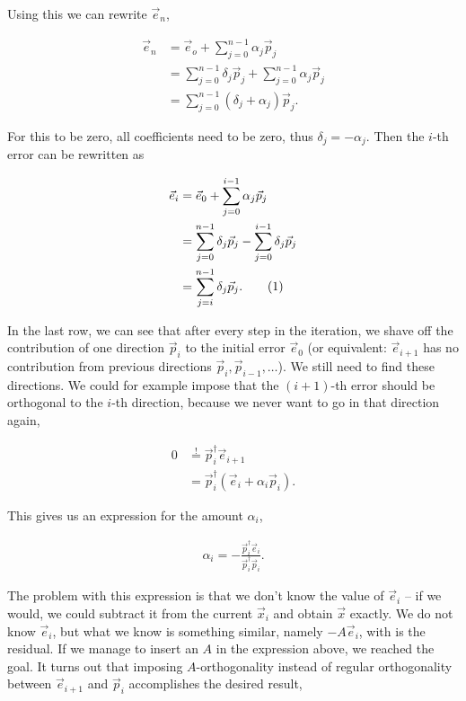 \documentclass{article}
\newcommand\numberthis{\addtocounter{equation}{1}\tag{\theequation}}
\theoremstyle{plain} %
\theoremstyle{convention} %
\theoremstyle{remark} %
\numberwithin{equation}{section}
\begin{document}
Using this we can rewrite $\vec{e}_n$,

\begin{align*}
    \vec{e}_{n} &= \vec{e}_o + \sum_{j=0}^{n-1} \alpha_j \vec{p}_j \\
                &= \sum_{j=0}^{n-1} \delta_j \vec{p}_j + \sum_{j=0}^{n-1} \alpha_j \vec{p}_j \\
                &= \sum_{j=0}^{n-1} (\delta_j + \alpha_j) \vec{p}_j.
\end{align*}

For this to be zero, all coefficients need to be zero, thus $\delta_j = - \alpha_j$. Then the $i$-th error can be rewritten as

\begin{align*}
    \vec{e}_{i} &= \vec{e}_0 + \sum_{j=0}^{i-1} \alpha_j \vec{p}_j \\
                &= \sum_{j=0}^{n-1} \delta_j \vec{p}_j - \sum_{j=0}^{i-1} \delta_j \vec{p}_j \\
                &= \sum_{j=i}^{n-1} \delta_j \vec{p}_j. \numberthis \label{eq:error_i}
\end{align*}

In the last row, we can see that after every step in the iteration, we shave off the contribution of one direction $\vec{p}_i$ to the initial error $\vec{e}_0$ (or equivalent: $\vec{e}_{i+1}$ has no contribution from previous directions $\vec{p}_i, \vec{p}_{i-1}, \dots$). We still need to find these directions. We could for example impose that the $(i+1)$-th error should be orthogonal to the $i$-th direction, because we never want to go in that direction again,

\begin{align*}
    0 &\stackrel{!}{=} \vec{p}_i^{\dagger} \vec{e}_{i+1} \\
                    &= \vec{p}_i^{\dagger} ( \vec{e}_{i} + \alpha_i \vec{p}_i ).
\end{align*}

This gives us an expression for the amount $\alpha_i$,

\begin{align*}
    \alpha_i = - \frac{ \vec{p}_i^{\dagger} \vec{e}_{i} }{ \vec{p}_i^{\dagger} \vec{p}_i }.
\end{align*}

The problem with this expression is that we don't know the value of $\vec{e}_i$ -- if we would, we could subtract it from the current $\vec{x}_i$ and obtain $\vec{x}$ exactly. We do not know $\vec{e}_i$, but what we know is something similar, namely $-A \vec{e}_i$, with is the residual. If we manage to insert an $A$ in the expression above, we reached the goal. It turns out that imposing $A$-orthogonality instead of regular orthogonality between $\vec{e}_{i+1}$ and $\vec{p}_i$ accomplishes the desired result\footnotemark,
\end{document}
